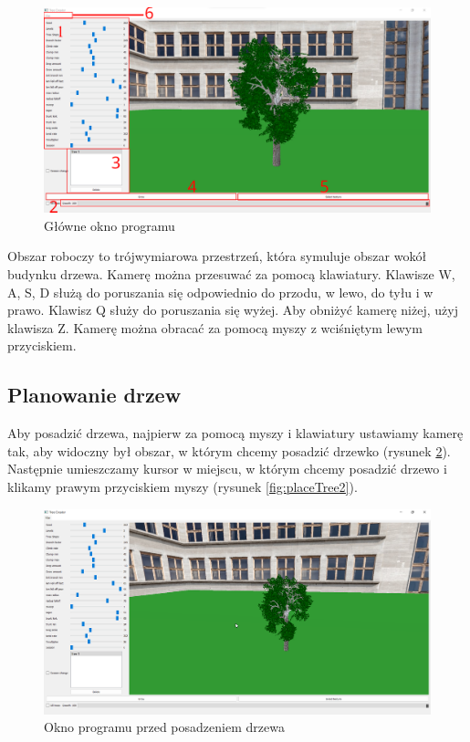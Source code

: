\documentclass[a4paper,twoside,12pt]{report}
\begin{document}
\begin{figure}[H]
	\centering\includegraphics[width=15.5cm]{grafika/program/main2.png}
	\caption{Główne okno programu}
    \label{fig:screenmainwindow}
\end{figure}

Obszar roboczy to trójwymiarowa przestrzeń, która symuluje obszar 
wokół budynku drzewa. Kamerę można przesuwać za pomocą klawiatury. 
Klawisze W, A, S, D służą do poruszania się odpowiednio do przodu, 
w lewo, do tyłu i w prawo. Klawisz Q służy do poruszania się wyżej. 
Aby obniżyć kamerę niżej, użyj klawisza Z. 
Kamerę można obracać za pomocą myszy z wciśniętym lewym przyciskiem.  


\subsection{Planowanie drzew}

Aby posadzić drzewa, najpierw za pomocą myszy i klawiatury 
ustawiamy kamerę tak, aby widoczny był obszar, w którym chcemy 
posadzić drzewko (rysunek \ref{fig:placeTree}). Następnie umieszczamy kursor w miejscu, w którym 
chcemy posadzić drzewo i klikamy prawym przyciskiem myszy (rysunek \ref{fig:placeTree2}).


\begin{figure}[H]
	\centering\includegraphics[width=15.5cm]{grafika/program/placeTree.png}
	\caption{Okno programu przed posadzeniem drzewa}
    \label{fig:placeTree}
\end{figure}
\end{document}
